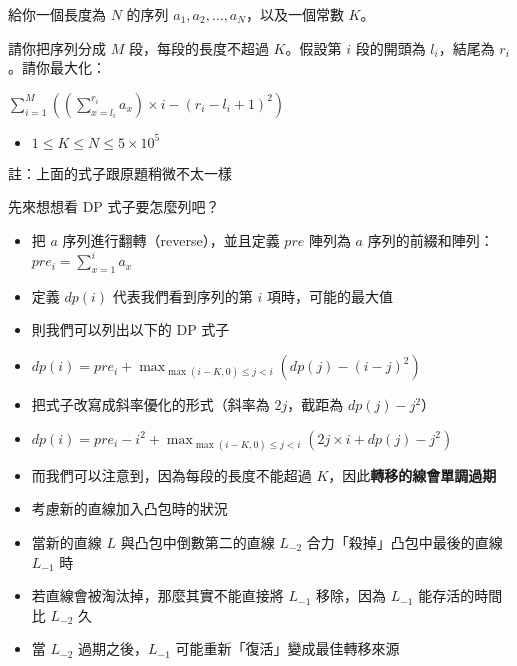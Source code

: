 \documentclass[standalone]{beamer}
\begin{document}
\begin{frame}{}
  \begin{problem}
    給你一個長度為 $N$ 的序列 $a_1, a_2, \dots, a_N$，以及一個常數 $K$。

    請你把序列分成 $M$ 段，每段的長度不超過 $K$。假設第 $i$ 段的開頭為 $l_i$，結尾為 $r_i$。請你最大化：

    $\sum_{i = 1}^{M}((\sum_{x = l_i}^{r_i}a_x) \times i - (r_i - l_i + 1)^2)$

    \begin{itemize}
      \item $1 \leq K \leq N \leq 5 \times 10^5$
    \end{itemize}

    註：上面的式子跟原題稍微不太一樣
  \end{problem}
  先來想想看 DP 式子要怎麼列吧？
\end{frame}

\begin{frame}{}
  \begin{itemize}
    \item 把 $a$ 序列進行翻轉（reverse），並且定義 $pre$ 陣列為 $a$ 序列的前綴和陣列： $pre_i = \sum_{x = 1}^{i} a_x$
    \item 定義 $dp(i)$ 代表我們看到序列的第 $i$ 項時，可能的最大值
    \item 則我們可以列出以下的 DP 式子
    \item $dp(i) = pre_i + \max_{\max(i - K, 0) \leq j < i}(dp(j) - (i - j)^2)$
    \item 把式子改寫成斜率優化的形式（斜率為 $2j$，截距為 $dp(j) - j^2$）
    \item $dp(i) = pre_i - i^2 + \max_{\max(i - K, 0) \leq j < i}(2j \times i + dp(j) - j^2)$
    \item 而我們可以注意到，因為每段的長度不能超過 $K$，因此\textbf{轉移的線會單調過期}
  \end{itemize}
\end{frame}

\begin{frame}{}
  \begin{itemize}
    \item 考慮新的直線加入凸包時的狀況
    \item 當新的直線 $L$ 與凸包中倒數第二的直線 $L_{-2}$ 合力「殺掉」凸包中最後的直線 $L_{-1}$ 時
    \item 若直線會被淘汰掉，那麼其實不能直接將 $L_{-1}$ 移除，因為 $L_{-1}$ 能存活的時間比 $L_{-2}$ 久
    \item 當 $L_{-2}$ 過期之後，$L_{-1}$ 可能重新「復活」變成最佳轉移來源
  \end{itemize}
\end{frame}
\end{document}
